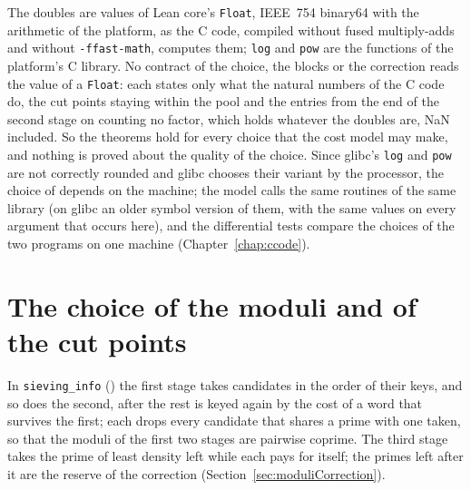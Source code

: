 \begin{remark}\label{rem:moduliFloats}
  The doubles are values of Lean core's \verb|Float|, IEEE~754 binary64 with the arithmetic of the
  platform, as the C code, compiled without fused multiply-adds and without \verb|-ffast-math|,
  computes them; \verb|log| and \verb|pow| are the functions of the platform's C library. No
  contract of the choice, the blocks or the correction reads the value of a \verb|Float|: each
  states only what the natural numbers of the C code do, the cut points staying within the pool and
  the entries from the end of the second stage on counting no factor, which holds whatever the
  doubles are, NaN included. So the theorems hold for every choice that the cost model may make, and
  nothing is proved about the quality of the choice. Since glibc's \verb|log| and \verb|pow| are
  not correctly rounded and glibc chooses their variant by the processor, the choice of \ratpoints{}
  depends on the machine; the model calls the same routines of the same library (on glibc an older
  symbol version of them, with the same values on every argument that occurs here), and the
  differential tests compare the choices of the two programs on one machine
  (Chapter~\ref{chap:ccode}).
\end{remark}

\section{The choice of the moduli and of the cut points}\label{sec:moduliChoice}

In \verb|sieving_info| () the first stage takes candidates in
the order of their keys, and so does the second, after the rest is keyed again by the cost of a word
that survives the first; each drops every candidate that shares a prime with one taken, so that the
moduli of the first two stages are pairwise coprime. The third stage takes the prime of least
density left while each pays for itself; the primes left after it are the reserve of the correction
(Section~\ref{sec:moduliCorrection}).

